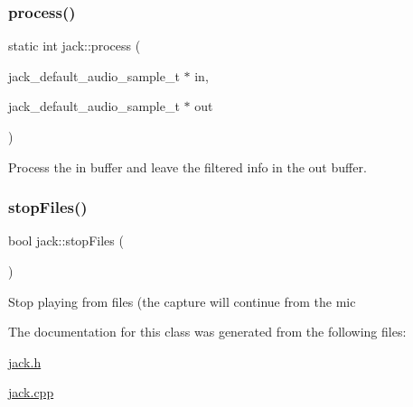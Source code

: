 \subsubsection{\texorpdfstring{process()}{process()}}
{\footnotesize\ttfamily static int jack\+::process (\begin{DoxyParamCaption}\item[{jack\+\_\+default\+\_\+audio\+\_\+sample\+\_\+t $\ast$}]{in,  }\item[{jack\+\_\+default\+\_\+audio\+\_\+sample\+\_\+t $\ast$}]{out }\end{DoxyParamCaption})\hspace{0.3cm}{\ttfamily [static]}}

Process the in buffer and leave the filtered info in the out buffer. \mbox{\label{classjack_a9b41aab061c8ce636b45c7e82212ed5c}} 
\subsubsection{\texorpdfstring{stop\+Files()}{stopFiles()}}
{\footnotesize\ttfamily bool jack\+::stop\+Files (\begin{DoxyParamCaption}{ }\end{DoxyParamCaption})\hspace{0.3cm}{\ttfamily [static]}}

Stop playing from files (the capture will continue from the mic 

The documentation for this class was generated from the following files\+:\begin{DoxyCompactItemize}
\item 
\hyperlink{jack_8h}{jack.\+h}\item 
\hyperlink{jack_8cpp}{jack.\+cpp}\end{DoxyCompactItemize}
